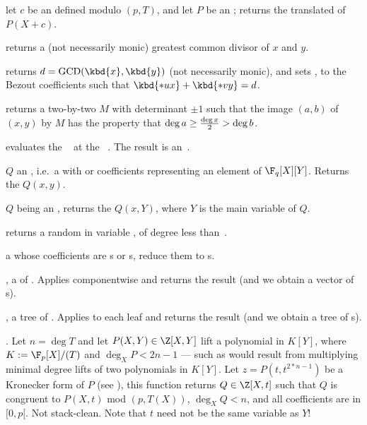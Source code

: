  let $c$ be an 
defined modulo $(p, T)$, and let $P$ be an ; returns the translated
 of $P(X+c)$.

 returns a (not necessarily
monic) greatest common divisor of $x$  and $y$.

returns $d = \text{GCD}(\kbd{x},\kbd{y})$ (not necessarily monic), and sets
,  to the Bezout coefficients such that $\kbd{*ux} +
\kbd{*vy} = d$.

 returns a two-by-two
 $M$ with determinant $\pm 1$ such that the image $(a,b)$ of $(x,y)$
by $M$ has the property that $\deg a \geq {\deg x \over 2} > \deg b$.

 evaluates the ~
at the ~. The result is an~.

 $Q$ an ,
i.e.~a  with  or  coefficients representing an
element of $\F_q[X][Y]$. Returns the  $Q(x,y)$.

 $Q$ being an ,
returns the  $Q(x,Y)$, where $Y$ is the main variable of $Q$.

 returns a random
 in variable , of degree less than~.


  a  whose
coefficients are s or s, reduce them to s.

,  a  of . Applies
 componentwise and returns the result (and we obtain a vector
of s).

,  a tree of . Applies
 to each leaf and returns the result (and we obtain a tree
of s).


. Let $n = \deg T$ and let
$P(X,Y)\in \Z[X,Y]$ lift a polynomial in $K[Y]$, where $K := \F_p[X]/(T)$ and
$\deg_X P < 2n-1$ --- such as would result from multiplying minimal degree
lifts of two polynomials in $K[Y]$. Let $z = P(t,t^{2*n-1})$ be a Kronecker
form of $P$ (see ), this function returns $Q\in
\Z[X,t]$ such that $Q$ is congruent to $P(X,t)$ mod $(p, T(X))$, $\deg_X Q <
n$, and all coefficients are in $[0,p[$. Not stack-clean. Note that $t$ need
not be the same variable as $Y$!

